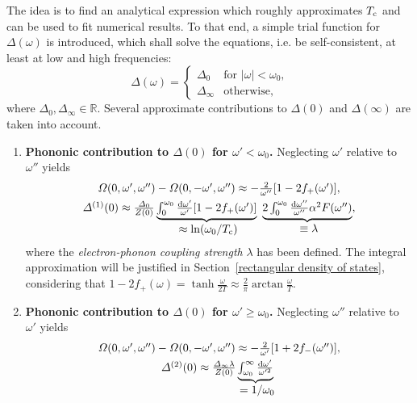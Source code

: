 The idea is to find an analytical expression which roughly approximates $T \sb{\text{c}}$ and can be used to fit numerical results. To that end, a simple trial
function for $\Delta(\omega)$ is introduced, which shall solve the
 equations, i.e. be self-consistent, at least at low and high
frequencies:
%
\begin{equation*}
    \Delta(\omega) = \begin{cases}
        \Delta_0 & \text{for $|\omega| < \omega_0$,} \\
        \Delta_\infty & \text{otherwise,}
    \end{cases}
\end{equation*}
%
where $\Delta_0, \Delta_\infty \in \mathds R$. Several approximate contributions
to $\Delta(0)$ and $\Delta(\infty)$ are taken into account.
%
\begin{enumerate}
    \item \textbf{Phononic contribution to \bm$\Delta(0)$ for \bm$\omega' <
    \omega_0$.} Neglecting $\omega'$ relative to $\omega''$ yields
    \begin{gather*}
        \Omega(0, \omega', \omega'') - \Omega(0, -\omega', \omega'')
        \approx -\frac 2 {\omega''} [1 - 2 f_+(\omega')],
        \\
        \Delta^{(1)}(0) \approx \frac{\Delta_0}{Z(0)}
        \hypo
            {\int_0^{\omega_0} \frac{\D \omega'}{\omega'} [1 - 2 f_+(\omega')]}
            {\approx \ln(\omega_0 / T \sub c)} \
        \hypo
            {2 \int_0^{\omega_0} \frac{\D \omega''}{\omega''}
            \alpha^2 F(\omega'')}{\equiv \lambda},
    \end{gather*}
    where the \emph{electron-phonon coupling strength} $\lambda$ has been
    defined. The integral approximation will be justified in
    Section~\ref{rectangular density of states}, considering that $1 - 2
    f_+(\omega) = \tanh \frac \omega {2 T} \approx \frac 2 \pi \arctan \frac
    \omega T$.
    \item \textbf{Phononic contribution to \bm$\Delta(0)$ for \bm$\omega' \geq
    \omega_0$.} Neglecting $\omega''$ relative to $\omega'$ yields
    \begin{gather*}
        \Omega(0, \omega', \omega'') - \Omega(0, -\omega', \omega'')
        \approx -\frac 2 {\omega'} [1 + 2 f_-(\omega'')],
        \\
        \Delta^{(2)}(0) \approx \frac{\Delta_\infty \lambda}{Z(0)}
        \hypo
            {\int_{\omega_0}^\infty \frac{\D \omega'}{\omega'^2}}
            {= 1 / \omega_0} \

\end{gather*}
\end{enumerate}
